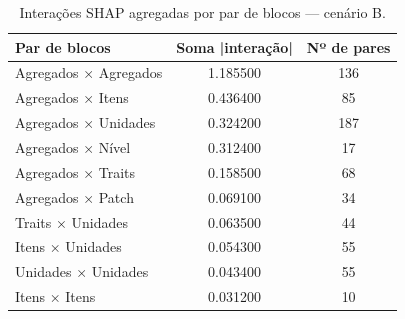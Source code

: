 \begin{table}[htbp]
\caption{Interações SHAP agregadas por par de blocos — cenário B.}
\label{tab:interbB}
\centering
\small
\begin{tabular}{lcc}
\toprule
Par de blocos & Soma |interação| & Nº de pares \\
\midrule
Agregados × Agregados & 1.185500 & 136 \\
Agregados × Itens & 0.436400 & 85 \\
Agregados × Unidades & 0.324200 & 187 \\
Agregados × Nível & 0.312400 & 17 \\
Agregados × Traits & 0.158500 & 68 \\
Agregados × Patch & 0.069100 & 34 \\
Traits × Unidades & 0.063500 & 44 \\
Itens × Unidades & 0.054300 & 55 \\
Unidades × Unidades & 0.043400 & 55 \\
Itens × Itens & 0.031200 & 10 \\
\bottomrule
\end{tabular}
\end{table}
